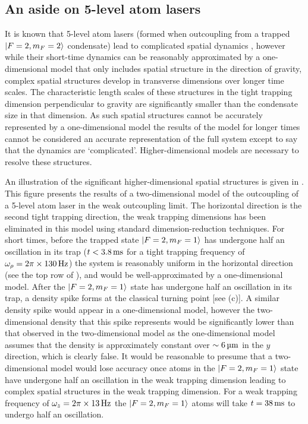 \subsection{An aside on 5-level atom lasers}
\label{OpticalPumping:5LevelModel}

It is known that 5-level atom lasers (formed when outcoupling from a trapped ${\left|F=2, m_F=2\right>}$ condensate) lead to complicated spatial dynamics \citep{Dugue:2007fk}, however while their short-time dynamics can be reasonably approximated by a one-dimensional model that only includes spatial structure in the direction of gravity, complex spatial structures develop in transverse dimensions over longer time scales.  The characteristic length scales of these structures in the tight trapping dimension perpendicular to gravity are significantly smaller than the condensate size in that dimension.  As such spatial structures cannot be accurately represented by a one-dimensional model the results of the model for longer times cannot be considered an accurate representation of the full system except to say that the dynamics are `complicated'.  Higher-dimensional models are necessary to resolve these structures.

An illustration of the significant higher-dimensional spatial structures is given in .  This figure presents the results of a two-dimensional model of the outcoupling of a 5-level atom laser in the weak outcoupling limit.  The horizontal direction is the second tight trapping direction, the weak trapping dimensions has been eliminated in this model using standard dimension-reduction techniques.  For short times, before the trapped state ${\left|F=2, m_F=1\right>}$ has undergone half an oscillation in its trap ($t < \unit[3.8]{ms}$ for a tight trapping frequency of $\omega_\rho = 2\pi \times \unit[130]{Hz}$) the system is reasonably uniform in the horizontal direction (see the top row of ), and would be well-approximated by a one-dimensional model.  After the ${\left|F=2, m_F=1\right>}$ state has undergone half an oscillation in its trap, a density spike forms at the classical turning point [see (c)].  A similar density spike would appear in a one-dimensional model, however the two-dimensional density that this spike represents would be significantly lower than that observed in the two-dimensional model as the one-dimensional model assumes that the density is approximately constant over $\sim\unit[6]{\micro m}$ in the $y$ direction, which is clearly false.  It would be reasonable to presume that a two-dimensional model would lose accuracy once atoms in the ${\left|F=2, m_F=1\right>}$ state have undergone half an oscillation in the weak trapping dimension leading to complex spatial structures in the weak trapping dimension.  For a weak trapping frequency of $\omega_z = 2\pi \times \unit[13]{Hz}$ the ${\left|F=2, m_F=1\right>}$ atoms will take $t = \unit[38]{ms}$ to undergo half an oscillation.

